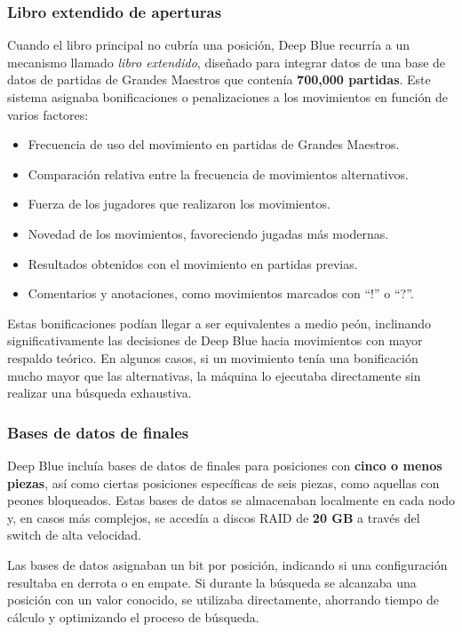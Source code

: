 \documentclass[12pt,a4paper]{article}
\begin{document}
\subsubsection*{Libro extendido de aperturas}
Cuando el libro principal no cubría una posición, Deep Blue recurría a un mecanismo llamado \textit{libro extendido}, diseñado para integrar datos de una base de datos de partidas de Grandes Maestros que contenía \textbf{700,000 partidas}. Este sistema asignaba bonificaciones o penalizaciones a los movimientos en función de varios factores:
\begin{itemize}
    \item Frecuencia de uso del movimiento en partidas de Grandes Maestros.
    \item Comparación relativa entre la frecuencia de movimientos alternativos.
    \item Fuerza de los jugadores que realizaron los movimientos.
    \item Novedad de los movimientos, favoreciendo jugadas más modernas.
    \item Resultados obtenidos con el movimiento en partidas previas.
    \item Comentarios y anotaciones, como movimientos marcados con ``!'' o ``?''.
\end{itemize}
Estas bonificaciones podían llegar a ser equivalentes a medio peón, inclinando significativamente las decisiones de Deep Blue hacia movimientos con mayor respaldo teórico. En algunos casos, si un movimiento tenía una bonificación mucho mayor que las alternativas, la máquina lo ejecutaba directamente sin realizar una búsqueda exhaustiva.

\subsubsection*{Bases de datos de finales}
Deep Blue incluía bases de datos de finales para posiciones con \textbf{cinco o menos piezas}, así como ciertas posiciones específicas de seis piezas, como aquellas con peones bloqueados. Estas bases de datos se almacenaban localmente en cada nodo y, en casos más complejos, se accedía a discos RAID de \textbf{20 GB} a través del switch de alta velocidad.

Las bases de datos asignaban un bit por posición, indicando si una configuración resultaba en derrota o en empate. Si durante la búsqueda se alcanzaba una posición con un valor conocido, se utilizaba directamente, ahorrando tiempo de cálculo y optimizando el proceso de búsqueda.
\end{document}
